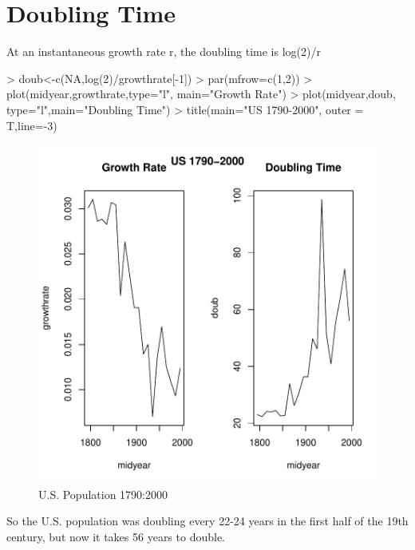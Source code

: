 \documentclass[a4paper]{article}
\begin{document}
\section*{Doubling Time}
At an instantaneous growth rate r, the doubling time is log(2)/r
\begin{Schunk}
\begin{Sinput}
> doub<-c(NA,log(2)/growthrate[-1])
> par(mfrow=c(1,2))
> plot(midyear,growthrate,type="l", main="Growth Rate")
> plot(midyear,doub, type="l",main="Doubling Time")
> title(main="US 1790-2000\n", outer = T,line=-3)
\end{Sinput}
\end{Schunk}
\begin{figure}[!h]
\begin{center}
\includegraphics{GRDT-fig2}
\end{center}
\caption{U.S. Population 1790:2000}
\label{fig:dt}
\end{figure}

So the U.S. population was doubling every 22-24 years in the first half of the 19th century, but now it takes 56 years to double.
\end{document}
